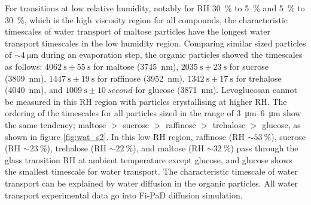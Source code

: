 For transitions at low relative humidity, notably for RH \SI{30}{\percent} to \SI{5}{\percent} and \SI{5}{\percent} to \SI{30}{\percent}, which is the high viscosity region for all compounds, the characteristic timescales of water transport of maltose particles have the longest water transport timescales in the low humidity region. Comparing similar sized particles of $\sim \SI{4}{\micro\meter}$ during an evaporation step, the organic particles showed the timescales as follows: $\SI{4062}{\second} \pm \SI{55}{\second}$ for maltose (\SI{3745}{\nano\meter}), $\SI{2035}{\second} \pm \SI{23}{\second}$ for sucrose (\SI{3809}{\nano\meter}), $\SI{1447}{\second} \pm \SI{19}{\second}$ for raffinose (\SI{3952}{\nano\meter}), $\SI{1342}{\second} \pm \SI{17}{\second}$ for trehalose (\SI{4040}{\nano\meter}), and $\SI{1009}{\second} \pm \SI{10}{second}$ for glucose (\SI{3871}{\nano\meter}). Levoglucosan cannot be measured in this RH region with particles crystallising at higher RH. The ordering of the timescales for all particles sized in the range of \SIrange[range-phrase=--]{3}{6}{\micro\meter} show the same tendency; maltose $>$ sucrose $>$ raffinose $>$ trehalose $>$ glucose, as shown in figure \ref{fig:wat_s2}. In this low RH region, raffinose (RH $\sim \SI{53}{\percent}$)\cite{Song2016a}\cite{Tong2011}, sucrose (RH $\sim \SI{23}{\percent}$)\cite{Song2016a}\cite{Tong2011}, trehalose (RH $\sim \SI{22}{\percent}$)\cite{Song2016a}\cite{chenLiteratureReviewSupplemented2000}, and maltose (RH $\sim \SI{32}{\percent}$)\cite{Song2016a}\cite{fosterGlassTransitionRelated2006} pass through the glass transition RH at ambient temperature except glucose, and glucose shows the smallest timescale for water transport. The characteristic timescale of water transport can be explained by water diffusion in the organic particles. All water transport experimental data go into Fi-PaD diffusion simulation.


